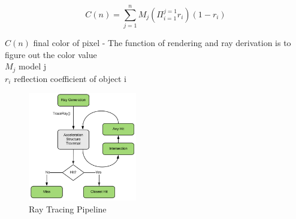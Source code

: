 \documentclass[xcolor=x11names,table]{beamer}
\begin{document}
\begin{frame}[allowframebreaks]
        \newpage
        \begin{equation}
            C(n) = \sum_{j=1}^{n}M_j(\Pi_{i=1}^{j=1}r_i)(1-r_i)
        \end{equation}
        
        $C(n)$ final color of pixel - The function of rendering and ray derivation is to figure out the color value
        \\    
        $M_j$ model j
        \\
        $r_i$ reflection coefficient of object i
                
        \begin{figure}
            \centering
            \includegraphics[height=180px]{refs/raytrace_01-625x630.png}
            \caption{Ray Tracing Pipeline}
            \label{fig:rayTracingFlownVidia}
        \end{figure}
        
    \end{frame}
\end{document}
